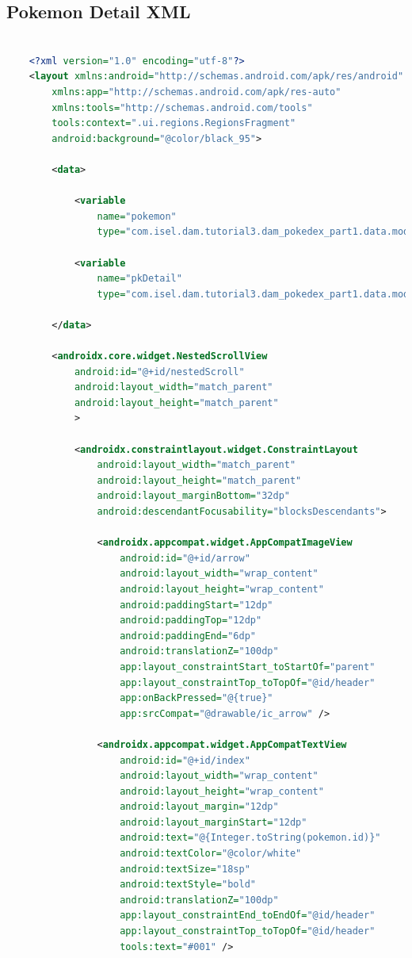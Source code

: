 \documentclass[a4paper, 12pt]{article}
\begin{document}
\subsection{Pokemon Detail XML}



\begin{lstlisting}[caption={Pokemon Detail Layout.}, label={layout:pk_detail}, language=XML]

    <?xml version="1.0" encoding="utf-8"?>
    <layout xmlns:android="http://schemas.android.com/apk/res/android"
        xmlns:app="http://schemas.android.com/apk/res-auto"
        xmlns:tools="http://schemas.android.com/tools"
        tools:context=".ui.regions.RegionsFragment"
        android:background="@color/black_95">
    
        <data>
    
            <variable
                name="pokemon"
                type="com.isel.dam.tutorial3.dam_pokedex_part1.data.model.Pokemon" />
    
            <variable
                name="pkDetail"
                type="com.isel.dam.tutorial3.dam_pokedex_part1.data.model.PokemonDetail" />
    
        </data>
    
        <androidx.core.widget.NestedScrollView
            android:id="@+id/nestedScroll"
            android:layout_width="match_parent"
            android:layout_height="match_parent"
            >
    
            <androidx.constraintlayout.widget.ConstraintLayout
                android:layout_width="match_parent"
                android:layout_height="match_parent"
                android:layout_marginBottom="32dp"
                android:descendantFocusability="blocksDescendants">
    
                <androidx.appcompat.widget.AppCompatImageView
                    android:id="@+id/arrow"
                    android:layout_width="wrap_content"
                    android:layout_height="wrap_content"
                    android:paddingStart="12dp"
                    android:paddingTop="12dp"
                    android:paddingEnd="6dp"
                    android:translationZ="100dp"
                    app:layout_constraintStart_toStartOf="parent"
                    app:layout_constraintTop_toTopOf="@id/header"
                    app:onBackPressed="@{true}"
                    app:srcCompat="@drawable/ic_arrow" />
    
                <androidx.appcompat.widget.AppCompatTextView
                    android:id="@+id/index"
                    android:layout_width="wrap_content"
                    android:layout_height="wrap_content"
                    android:layout_margin="12dp"
                    android:layout_marginStart="12dp"
                    android:text="@{Integer.toString(pokemon.id)}"
                    android:textColor="@color/white"
                    android:textSize="18sp"
                    android:textStyle="bold"
                    android:translationZ="100dp"
                    app:layout_constraintEnd_toEndOf="@id/header"
                    app:layout_constraintTop_toTopOf="@id/header"
                    tools:text="#001" />
    

\end{lstlisting}
\end{document}
